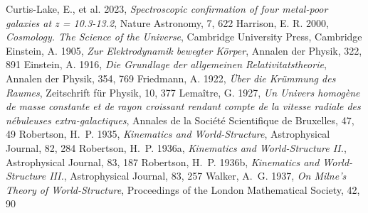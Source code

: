 \documentclass[useAMS,danish]{aa}
\begin{document}
\begin{thebibliography}{99}
        Curtis-Lake, E., et al. 2023,  \emph{Spectroscopic confirmation of four metal-poor galaxies at z = 10.3-13.2},  Nature Astronomy, 7, 622
              Harrison, E. R.         2000,  \emph{Cosmology. The Science of the Universe},                                   Cambridge University Press, Cambridge
              Einstein, A.            1905,  \emph{Zur Elektrodynamik bewegter Körper},                                       Annalen der Physik, 322, 891
              Einstein, A.            1916,  \emph{Die Grundlage der allgemeinen Relativit{a}tstheorie},                      Annalen der Physik, 354, 769
            Friedmann, A.           1922,  \emph{Über die Krümmung des Raumes},                                             Zeitschrift für Physik, 10, 377
              Lemaître, G.            1927,  \emph{Un Univers homogène de masse constante et de rayon
                                                                                         croissant rendant compte de la vitesse radiale des
                                                                                         nébuleuses extra-galactiques},                                             Annales de la Société Scientifique de Bruxelles, 47, 49
            Robertson, H.~P.        1935,  \emph{Kinematics and World-Structure},                                           Astrophysical Journal, 82, 284
          Robertson, H.~P.        1936a, \emph{Kinematics and World-Structure II.},                                       Astrophysical Journal, 83, 187
          Robertson, H.~P.        1936b, \emph{Kinematics and World-Structure III.},                                      Astrophysical Journal, 83, 257
                  Walker, A.~G.           1937,  \emph{On Milne's Theory of World-Structure},                                     Proceedings of the London Mathematical Society, 42, 90
\end{thebibliography}
\end{document}
